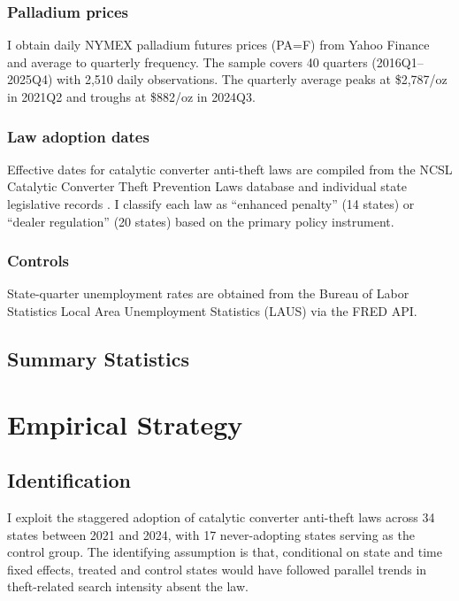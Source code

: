 \documentclass[12pt]{article}
\begin{document}
\subsubsection*{Palladium prices} I obtain daily NYMEX palladium futures prices (PA=F) from Yahoo Finance and average to quarterly frequency. The sample covers 40 quarters (2016Q1--2025Q4) with 2,510 daily observations. The quarterly average peaks at \$2,787/oz in 2021Q2 and troughs at \$882/oz in 2024Q3.

\subsubsection*{Law adoption dates} Effective dates for catalytic converter anti-theft laws are compiled from the NCSL Catalytic Converter Theft Prevention Laws database and individual state legislative records \citep{ncsl2024catalytic}. I classify each law as ``enhanced penalty'' (14 states) or ``dealer regulation'' (20 states) based on the primary policy instrument.

\subsubsection*{Controls} State-quarter unemployment rates are obtained from the Bureau of Labor Statistics Local Area Unemployment Statistics (LAUS) via the FRED API.

\subsection{Summary Statistics}



\section{Empirical Strategy}

\subsection{Identification}

I exploit the staggered adoption of catalytic converter anti-theft laws across 34 states between 2021 and 2024, with 17 never-adopting states serving as the control group. The identifying assumption is that, conditional on state and time fixed effects, treated and control states would have followed parallel trends in theft-related search intensity absent the law.
\end{document}
